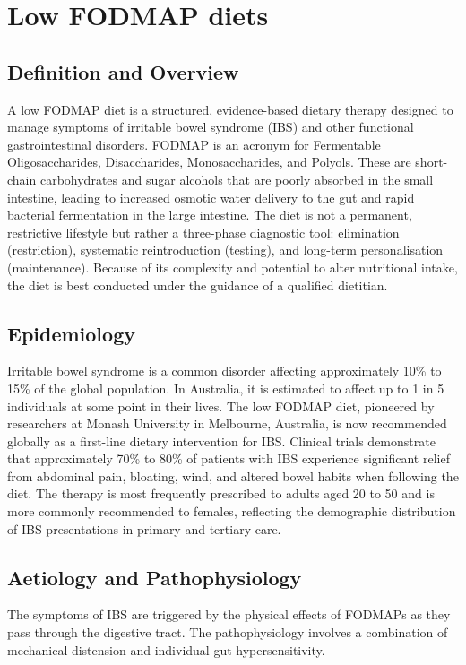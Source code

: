 \chapter{Low FODMAP diets}

\section*{Definition and Overview}
A low FODMAP diet is a structured, evidence-based dietary therapy designed to manage symptoms of irritable bowel syndrome (IBS) and other functional gastrointestinal disorders. FODMAP is an acronym for Fermentable Oligosaccharides, Disaccharides, Monosaccharides, and Polyols. These are short-chain carbohydrates and sugar alcohols that are poorly absorbed in the small intestine, leading to increased osmotic water delivery to the gut and rapid bacterial fermentation in the large intestine. The diet is not a permanent, restrictive lifestyle but rather a three-phase diagnostic tool: elimination (restriction), systematic reintroduction (testing), and long-term personalisation (maintenance). Because of its complexity and potential to alter nutritional intake, the diet is best conducted under the guidance of a qualified dietitian.

\section*{Epidemiology}
Irritable bowel syndrome is a common disorder affecting approximately 10\% to 15\% of the global population. In Australia, it is estimated to affect up to 1 in 5 individuals at some point in their lives. The low FODMAP diet, pioneered by researchers at Monash University in Melbourne, Australia, is now recommended globally as a first-line dietary intervention for IBS. Clinical trials demonstrate that approximately 70\% to 80\% of patients with IBS experience significant relief from abdominal pain, bloating, wind, and altered bowel habits when following the diet. The therapy is most frequently prescribed to adults aged 20 to 50 and is more commonly recommended to females, reflecting the demographic distribution of IBS presentations in primary and tertiary care.

\section*{Aetiology and Pathophysiology}
The symptoms of IBS are triggered by the physical effects of FODMAPs as they pass through the digestive tract. The pathophysiology involves a combination of mechanical distension and individual gut hypersensitivity.

